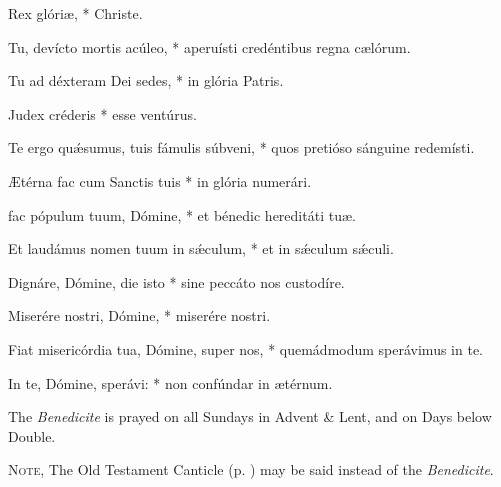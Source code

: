  Rex glóri{\ae}, * Christe.\par
{}
Tu, devícto mortis acúleo, * aperuísti credéntibus regna c{\ae}lórum.\par
Tu ad déxteram Dei sedes, * in glória Patris.\par
Judex créderis * esse ventúrus. \par
Te ergo quǽsumus, tuis fámulis súbveni, * quos pretióso sánguine redemísti.\par
{\AE}térna fac cum Sanctis tuis * in glória numerári.\par
{} fac pópulum tuum, Dómine, * et bénedic hereditáti tu{\ae}.\par
{}
Et laudámus nomen tuum in sǽculum, * et in sǽculum sǽculi.\par
Dignáre, Dómine, die isto * sine peccáto nos custodíre.\par
Miserére nostri, Dómine, * miserére nostri.\par
Fiat misericórdia tua, Dómine, super nos, * quemádmodum sperávimus in te.\par
In te, Dómine, sperávi: * non confúndar in {\ae}térnum.

\vspace{-2ex}

\vspace{-1ex}

\begin{rubric}
The \emph{Benedicite} is prayed on all Sundays in Advent \& Lent, and on Days below Double.\par
\textsc{Note,} The Old Testament Canticle (p. \pageref{OT}) may be said instead of the \emph{Benedicite}.
\end{rubric}

